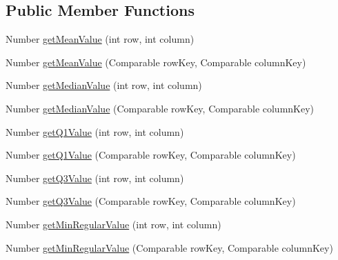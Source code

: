 \subsection*{Public Member Functions}
\begin{DoxyCompactItemize}
\item 
Number \mbox{\hyperlink{interfaceorg_1_1jfree_1_1data_1_1statistics_1_1_box_and_whisker_category_dataset_ab4be217901318f28508faad8c6e61a2c}{get\+Mean\+Value}} (int row, int column)
\item 
Number \mbox{\hyperlink{interfaceorg_1_1jfree_1_1data_1_1statistics_1_1_box_and_whisker_category_dataset_adaff6be1d6511f25dcc8c74496541262}{get\+Mean\+Value}} (Comparable row\+Key, Comparable column\+Key)
\item 
Number \mbox{\hyperlink{interfaceorg_1_1jfree_1_1data_1_1statistics_1_1_box_and_whisker_category_dataset_a0744eb012274b3be674933d67474ed65}{get\+Median\+Value}} (int row, int column)
\item 
Number \mbox{\hyperlink{interfaceorg_1_1jfree_1_1data_1_1statistics_1_1_box_and_whisker_category_dataset_aaaf3632c9a3f6aeb0d0c66454a206be3}{get\+Median\+Value}} (Comparable row\+Key, Comparable column\+Key)
\item 
Number \mbox{\hyperlink{interfaceorg_1_1jfree_1_1data_1_1statistics_1_1_box_and_whisker_category_dataset_a174d2b0408011a2efda5b82af2fd2dd8}{get\+Q1\+Value}} (int row, int column)
\item 
Number \mbox{\hyperlink{interfaceorg_1_1jfree_1_1data_1_1statistics_1_1_box_and_whisker_category_dataset_aed1b5795f0cd902a998e9abb82eb8556}{get\+Q1\+Value}} (Comparable row\+Key, Comparable column\+Key)
\item 
Number \mbox{\hyperlink{interfaceorg_1_1jfree_1_1data_1_1statistics_1_1_box_and_whisker_category_dataset_a54e8f4036ef00bd3674b490096ea44a2}{get\+Q3\+Value}} (int row, int column)
\item 
Number \mbox{\hyperlink{interfaceorg_1_1jfree_1_1data_1_1statistics_1_1_box_and_whisker_category_dataset_a2dfb9e06fad335ed51a486a44ae18acb}{get\+Q3\+Value}} (Comparable row\+Key, Comparable column\+Key)
\item 
Number \mbox{\hyperlink{interfaceorg_1_1jfree_1_1data_1_1statistics_1_1_box_and_whisker_category_dataset_a1f8c01c076b3119bc284d9018f673fda}{get\+Min\+Regular\+Value}} (int row, int column)
\item 
Number \mbox{\hyperlink{interfaceorg_1_1jfree_1_1data_1_1statistics_1_1_box_and_whisker_category_dataset_afadbc2ab28bb51815ab80b002177894e}{get\+Min\+Regular\+Value}} (Comparable row\+Key, Comparable column\+Key)

\end{DoxyCompactItemize}
